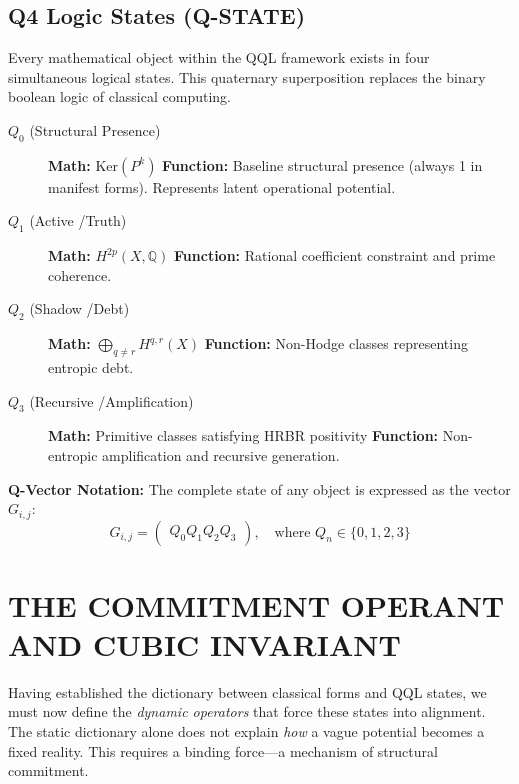 \documentclass[11pt, letterpaper]{article}
\begin{document}
\subsection{Q4 Logic States (Q-STATE)}\label{sec:2.4}

Every mathematical object within the QQL framework exists in four simultaneous logical states. This quaternary superposition replaces the binary boolean logic of classical computing.

\begin{description}
    \item[$Q_0$ (Structural Presence)] \hfill \tabularnewline
    \textbf{Math:} $\text{Ker}(P^k)$ \tabularnewline
    \textbf{Function:} Baseline structural presence (always 1 in manifest forms). Represents latent operational potential.

    \item[$Q_1$ (Active \slash  Truth)] \hfill \tabularnewline
    \textbf{Math:} $H^{2p}(X, \mathbb{Q})$ \tabularnewline
    \textbf{Function:} Rational coefficient constraint and prime coherence.

    \item[$Q_2$ (Shadow \slash  Debt)] \hfill \tabularnewline
    \textbf{Math:} $\bigoplus_{q \ne r} H^{q,r}(X)$ \tabularnewline
    \textbf{Function:} Non-Hodge classes representing entropic debt.

    \item[$Q_3$ (Recursive \slash  Amplification)] \hfill \tabularnewline
    \textbf{Math:} Primitive classes satisfying HRBR positivity \tabularnewline
    \textbf{Function:} Non-entropic amplification and recursive generation.
\end{description}

\noindent \textbf{Q-Vector Notation:}
The complete state of any object is expressed as the vector $G_{i, j}$:
\[
G_{i, j} = \begin{pmatrix}Q_0Q_1Q_2Q_3\end{pmatrix}, \quad \text{where } Q_n \in \{0, 1, 2, 3\}
\]

\section{THE COMMITMENT OPERANT AND CUBIC INVARIANT}\label{sec:partIII}

Having established the dictionary between classical forms and QQL states, we must now define the \textit{dynamic operators} that force these states into alignment. The static dictionary alone does not explain \textit{how} a vague potential becomes a fixed reality. This requires a binding force—a mechanism of structural commitment.
\end{document}
